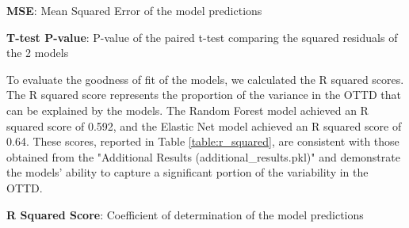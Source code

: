 \documentclass[11pt]{article}
\begin{document}
\begin{table}[h]
\caption{Comparison of Random Forest and Elastic Net model performance in predicting OTTD after hyperparameter tuning.}
\label{table:comparison_models}
\begin{threeparttable}
\renewcommand{\TPTminimum}{\linewidth}
\begin{tablenotes}
\footnotesize
\item \textbf{MSE}: Mean Squared Error of the model predictions
\item \textbf{T-test P-value}: P-value of the paired t-test comparing the squared residuals of the 2 models
\end{tablenotes}
\end{threeparttable}
\end{table}


To evaluate the goodness of fit of the models, we calculated the R squared scores. The R squared score represents the proportion of the variance in the OTTD that can be explained by the models. The Random Forest model achieved an R squared score of 0.592, and the Elastic Net model achieved an R squared score of 0.64. These scores, reported in Table {}\ref{table:r_squared}, are consistent with those obtained from the "Additional Results (additional\_results.pkl)" and demonstrate the models' ability to capture a significant portion of the variability in the OTTD.

\begin{table}[h]
\caption{R squared score for Random Forest and Elastic Net models in predicting OTTD.}
\label{table:r_squared}
\begin{threeparttable}
\renewcommand{\TPTminimum}{\linewidth}
\begin{tablenotes}
\footnotesize
\item \textbf{R Squared Score}: Coefficient of determination of the model predictions
\end{tablenotes}
\end{threeparttable}
\end{table}
\end{document}
